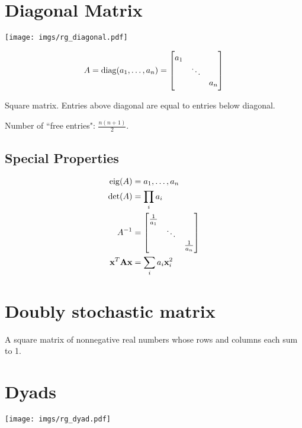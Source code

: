 \section{Diagonal Matrix}

\begin{center}
\texttt{[image: imgs/rg\_diagonal.pdf]}
\end{center}

\begin{equation}
A=\operatorname{diag}(a_1,\ldots,a_n)=
\begin{bmatrix}
a_1  &        &  \\
     & \ddots &  \\
     &        & a_n
\end{bmatrix}
\end{equation}

Square matrix. Entries above diagonal are equal to entries below diagonal.

Number of ``free entries": $\frac{n(n+1)}{2}$.

\subsection*{Special Properties}

\begin{align}
\operatorname{eig}(A) &= {a_1,\ldots,a_n}           \\
\det(A) &= \prod_i a_i                \\
A^{-1}  &=
\begin{bmatrix}
\frac{1}{a_1} &        &               \\
              & \ddots &               \\
              &        & \frac{1}{a_n}
\end{bmatrix} \\
\mathbf{x}^T \mathbf{A} \mathbf{x} &= \sum_i a_i \mathbf{x}_i^2
\end{align}

\section{Doubly stochastic matrix}
A square matrix of nonnegative real numbers whose rows and columns each sum to 1.


\section{Dyads}

\begin{center}
\texttt{[image: imgs/rg\_dyad.pdf]}
\end{center}

